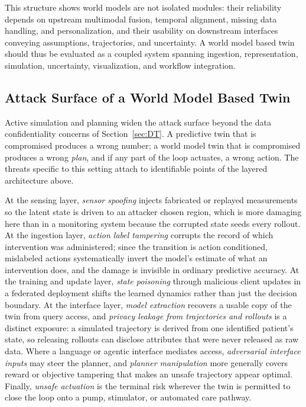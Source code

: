 \documentclass[journal]{IEEEtran}
\begin{document}
This structure shows world models are not isolated modules: their reliability depends on upstream multimodal fusion, temporal alignment, missing data handling, and personalization, and their usability on downstream interfaces conveying assumptions, trajectories, and uncertainty. A world model based twin should thus be evaluated as a coupled system spanning ingestion, representation, simulation, uncertainty, visualization, and workflow integration.

\subsection{Attack Surface of a World Model Based Twin}
Active simulation and planning widen the attack surface beyond the data confidentiality concerns of Section~\ref{sec:DT}. A predictive twin that is compromised produces a wrong number; a world model twin that is compromised produces a wrong \emph{plan}, and if any part of the loop actuates, a wrong action. The threats specific to this setting attach to identifiable points of the layered architecture above.

At the sensing layer, \emph{sensor spoofing} injects fabricated or replayed measurements so the latent state is driven to an attacker chosen region, which is more damaging here than in a monitoring system because the corrupted state seeds every rollout. At the ingestion layer, \emph{action label tampering} corrupts the record of which intervention was administered; since the transition is action conditioned, mislabeled actions systematically invert the model's estimate of what an intervention does, and the damage is invisible in ordinary predictive accuracy. At the training and update layer, \emph{state poisoning} through malicious client updates in a federated deployment shifts the learned dynamics rather than just the decision boundary. At the interface layer, \emph{model extraction} recovers a usable copy of the twin from query access, and \emph{privacy leakage from trajectories and rollouts} is a distinct exposure: a simulated trajectory is derived from one identified patient's state, so releasing rollouts can disclose attributes that were never released as raw data. Where a language or agentic interface mediates access, \emph{adversarial interface inputs} may steer the planner, and \emph{planner manipulation} more generally covers reward or objective tampering that makes an unsafe trajectory appear optimal. Finally, \emph{unsafe actuation} is the terminal risk wherever the twin is permitted to close the loop onto a pump, stimulator, or automated care pathway.
\end{document}
